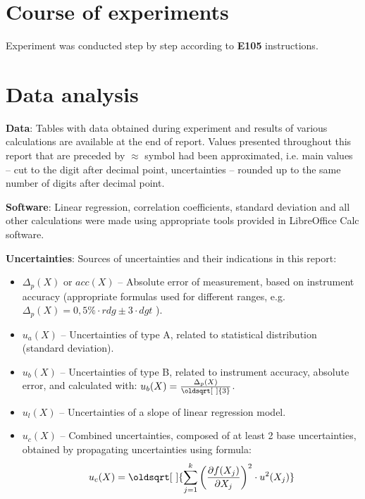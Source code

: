 \documentclass[12pt, a4paper]{extarticle}
\renewcommand*{\sqrt}[2][\ ]{\oldsqrt[#1]{#2} }
\newcommand{\experiment}{E105}
\begin{document}

	\section{Course of experiments}

	Experiment was conducted step by step according to \textbf{\experiment} instructions.

	\section{Data analysis}
	\begin{small}
		\indent \textbf{Data}: Tables with data obtained during experiment and results of various calculations are available at the end of report. Values presented throughout this report that are preceded by $ \approx $ symbol had been approximated, i.e. main values -- cut to the  digit after decimal point, uncertainties -- rounded up to the same number of digits after decimal point.

		\textbf{Software}: Linear regression, correlation coefficients, standard deviation and all other calculations were made using appropriate tools provided in LibreOffice Calc software.

		\textbf{Uncertainties}: Sources of uncertainties and their indications in this report:
		\begin{itemize}
			\setlength\itemsep{-0.2em}
			\item $ \Delta_p(X) $ or $ acc(X) $ -- Absolute error of measurement, based on instrument accuracy (appropriate formulas used for different ranges, e.g. $ \Delta_p(X) = 0,5\% \cdot rdg \pm 3 \cdot dgt $ ).
			\item $ u_a(X) $ -- Uncertainties of type A, related to statistical distribution (standard deviation).
			\item $ u_b(X) $ -- Uncertainties of type B, related to instrument accuracy, absolute error, and calculated with: $ u_b(X) = \frac{\Delta_p(X)}{\sqrt{3}} $.
			\item $ u_l(X) $ -- Uncertainties of a slope of linear regression model.
			\item $ u_c(X) $ -- Combined uncertainties, composed of at least 2 base uncertainties, obtained by propagating uncertainties using formula:
			\begin{equation}\label{key}
				u_c(X) = \sqrt{\sum_{j = 1}^{k}\left(\dfrac{\partial f(X_j)}{\partial X_j}\right)^2 \cdot u^2(X_j)}
			\end{equation}
		\end{itemize}
	\end{small}
\end{document}
